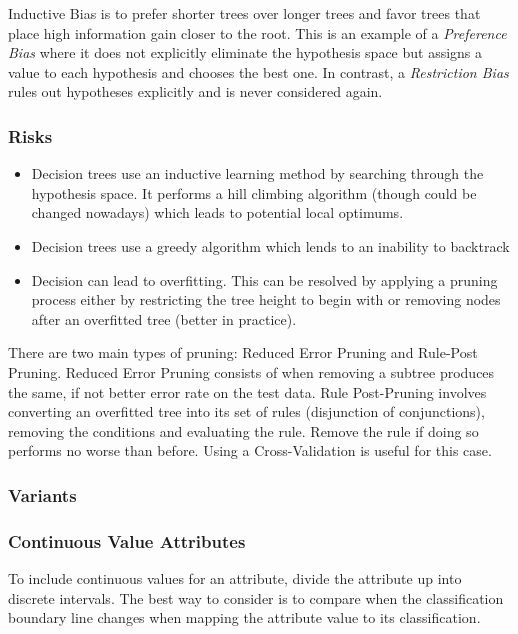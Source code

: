 \documentclass[11pt]{article}
\begin{document}
Inductive Bias is to prefer shorter trees over longer trees and favor trees that place high information gain closer to the root. This is an example of a \textit{Preference Bias} where it does not explicitly eliminate the hypothesis space but assigns a value to each hypothesis and chooses the best one. In contrast, a \textit{Restriction Bias} rules out hypotheses explicitly and is never considered again.

\subsubsection{Risks}

\begin{itemize}
\item Decision trees use an inductive learning method by searching through the hypothesis space. It performs a hill climbing algorithm (though could be changed nowadays) which leads to potential local optimums.
\item Decision trees use a greedy algorithm which lends to an inability to backtrack
\item Decision can lead to overfitting. This can be resolved by applying a pruning process either by restricting the tree height to begin with or removing nodes after an overfitted tree (better in practice).
\end{itemize}

There are two main types of pruning: Reduced Error Pruning and Rule-Post Pruning. Reduced Error Pruning consists of when removing a subtree produces the same, if not better error rate on the test data. Rule Post-Pruning involves converting an overfitted tree into its set of rules (disjunction of conjunctions), removing the conditions and evaluating the rule. Remove the rule if doing so performs no worse than before. Using a Cross-Validation is useful for this case.

\subsubsection{Variants}

\subsubsection*{Continuous Value Attributes}

To include continuous values for an attribute, divide the attribute up into discrete intervals. The best way to consider is to compare when the classification boundary line changes when mapping the attribute value to its classification.
\end{document}
